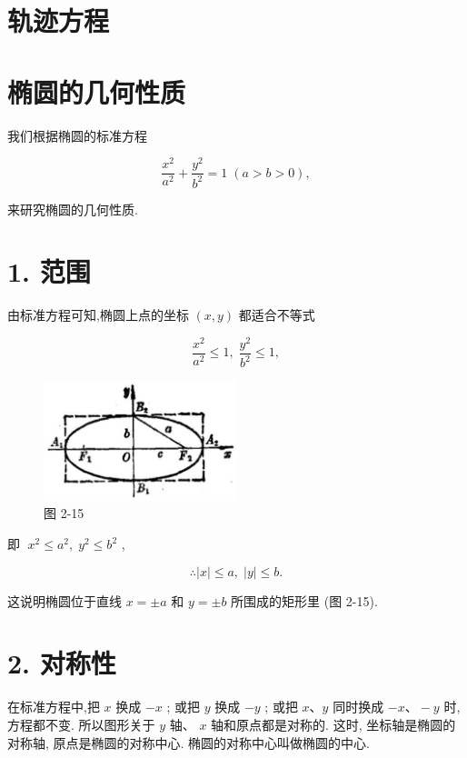 \documentclass[lang=cn,newtx,10pt,scheme=chinese]{elegantbook}
\begin{document}
\section*{轨迹方程}

\section{椭圆的几何性质}

我们根据椭圆的标准方程

\[
  \frac{{x}^{2}}{{a}^{2}} + \frac{{y}^{2}}{{b}^{2}} = 1\;\left( {a > b > 0}\right) ,
\]

来研究椭圆的几何性质.

\section*{1. 范围}

由标准方程可知,椭圆上点的坐标 \(\left( {x,y}\right)\) 都适合不等式

\[
  \frac{{x}^{2}}{{a}^{2}} \leq 1,\;\frac{{y}^{2}}{{b}^{2}} \leq 1,
\]

\begin{figure}[h]
  \centering
  \includegraphics[max width=0.5\textwidth]{images/01912cc2-ffb6-728e-9ae7-b113ff05c64b_90_426128.jpg}
  \caption{图 2-15}
\end{figure}



即 \(\;{x}^{2} \leq {a}^{2},\;{y}^{2} \leq {b}^{2}\) ,

\[
  \therefore \left| x\right| \leq a,\;\left| y\right| \leq b\text{.}
\]

这说明椭圆位于直线 \(x = \pm a\) 和 \(y = \pm b\) 所围成的矩形里 (图 2-15).

\section*{2. 对称性}

在标准方程中,把 \(x\) 换成 \(- x\) ; 或把 \(y\) 换成 \(- y\) ; 或把 \(x\text{、}y\) 同时换成 \(- x\text{、} - y\) 时,方程都不变. 所以图形关于 \(y\) 轴、 \(x\) 轴和原点都是对称的. 这时, 坐标轴是椭圆的对称轴, 原点是椭圆的对称中心. 椭圆的对称中心叫做椭圆的中心.
\end{document}

